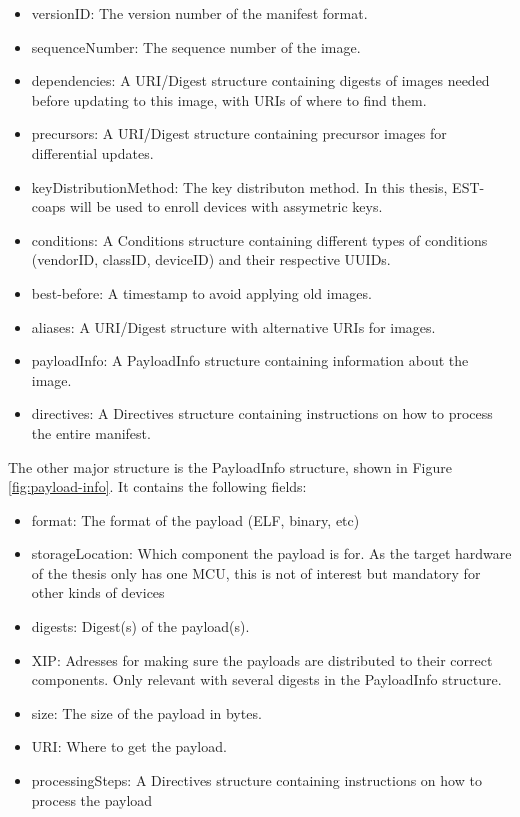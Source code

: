 \documentclass[0-thesis.tex]{subfiles}
\begin{document}
\begin{itemize}
    \item versionID: The version number of the manifest format. 
    \item sequenceNumber: The sequence number of the image.
    \item dependencies: A URI/Digest structure containing digests of images needed before
            updating to this image, with URIs of where to find them.
    \item precursors: A URI/Digest structure containing precursor images for differential
            updates. 
    \item keyDistributionMethod: The key distributon method. In this thesis, EST-coaps
            will be used to enroll devices with assymetric keys.
    \item conditions: A Conditions structure containing different types of conditions
            (vendorID, classID, deviceID) and their respective UUIDs.
    \item best-before: A timestamp to avoid applying old images.
    \item aliases: A URI/Digest structure with alternative URIs for images.
    \item payloadInfo: A PayloadInfo structure containing information about the image.
    \item directives: A Directives structure containing instructions on how to process the
        entire manifest.
\end{itemize}
 
The other major structure is the PayloadInfo structure, shown in Figure
\ref{fig:payload-info}. It contains the following fields:

\begin{itemize}
    \item format: The format of the payload (ELF, binary, etc)
    \item storageLocation: Which component the payload is for. As the target hardware of
        the thesis only has one MCU, this is not of interest but mandatory for other kinds
        of devices
    \item digests: Digest(s) of the payload(s).
    \item XIP: Adresses for making sure the payloads are distributed to their correct
        components. Only relevant with several digests in the PayloadInfo structure.
    \item size: The size of the payload in bytes.
    \item URI: Where to get the payload.
    \item processingSteps: A Directives structure containing instructions on how to
        process the payload
\end{itemize}
\end{document}
